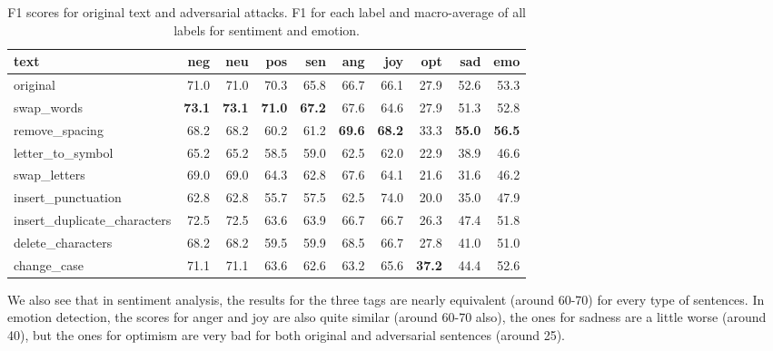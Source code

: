\documentclass[11pt,a4paper]{article}
\begin{document}
\begin{table}[ht]
\centering
\begin{tabular}{l|rrr|r|rrrr|r}
\toprule
                       text &  neg &  neu &  pos &  sen &  ang &  joy &  opt &  sad &  emo \\
\midrule
                       original &      71.0 &     71.0 &      70.3 &       65.8 &   66.7 & 66.1 &      27.9 &     52.6 &     53.3 \\
                 swap\_words &      \textbf{73.1} &     \textbf{73.1} &      \textbf{71.0} &       \textbf{67.2} &   67.6 & 64.6 &      27.9 &     51.3 &     52.8 \\
             remove\_spacing &      68.2 &     68.2 &      60.2 &       61.2 &   \textbf{69.6} & \textbf{68.2} &      33.3 &     \textbf{55.0} &     \textbf{56.5} \\
           letter\_to\_symbol &      65.2 &     65.2 &      58.5 &       59.0 &   62.5 & 62.0 &      22.9 &     38.9 &     46.6 \\
               swap\_letters &      69.0 &     69.0 &      64.3 &       62.8 &   67.6 & 64.1 &      21.6 &     31.6 &     46.2 \\
         insert\_punctuation &      62.8 &     62.8 &      55.7 &       57.5 &   62.5 & 74.0 &      20.0 &     35.0 &     47.9 \\
insert\_duplicate\_characters &      72.5 &     72.5 &      63.6 &       63.9 &   66.7 & 66.7 &      26.3 &     47.4 &     51.8 \\
          delete\_characters &      68.2 &     68.2 &      59.5 &       59.9 &   68.5 & 66.7 &      27.8 &     41.0 &     51.0 \\
                change\_case &      71.1 &     71.1 &      63.6 &       62.6 &   63.2 & 65.6 &      \textbf{37.2} &     44.4 &     52.6 \\
\bottomrule
\end{tabular}
\caption{F1 scores for original text and adversarial attacks. F1 for each label and macro-average of all labels for sentiment and emotion.}
\label{tab:f1_scores}
\end{table}

We also see that in sentiment analysis, the results for the three tags are nearly equivalent (around 60-70) for every type of sentences. In emotion detection, the scores for anger and joy are also quite similar (around 60-70 also), the ones for sadness are a little worse (around 40), but the ones for optimism are very bad for both original and adversarial sentences (around 25).
\end{document}
